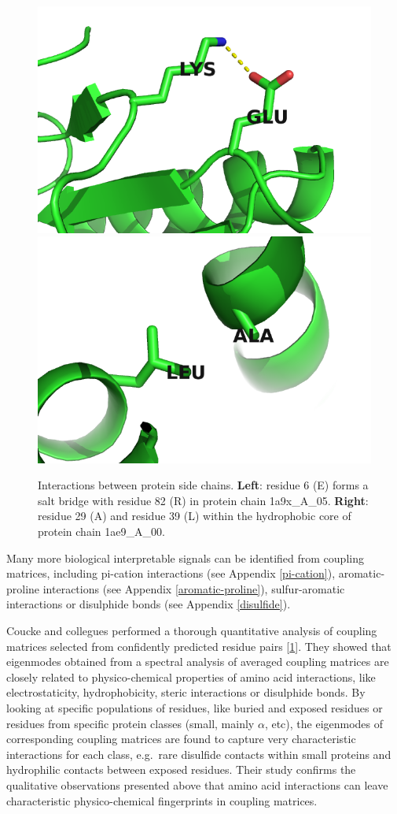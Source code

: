 \documentclass[12pt,a4paper,twoside]{book}
\theoremstyle{definition}
\theoremstyle{definition}
\theoremstyle{remark}
\begin{document}
\begin{figure}
\includegraphics[width=0.5\linewidth]{img/coupling_matrix_analysis/1a9xA05_6_82} \includegraphics[width=0.5\linewidth]{img/coupling_matrix_analysis/1ae9A00_29_39} \caption{Interactions between protein side
chains. \textbf{Left}: residue 6 (E) forms a salt bridge with residue 82
(R) in protein chain 1a9x\_A\_05. \textbf{Right}: residue 29 (A) and
residue 39 (L) within the hydrophobic core of protein chain 1ae9\_A\_00.}\label{fig:coupling-matrix-pymol}
\end{figure}

Many more biological interpretable signals can be identified from
coupling matrices, including pi-cation interactions (see Appendix
\ref{pi-cation}), aromatic-proline interactions (see Appendix
\ref{aromatic-proline}), sulfur-aromatic interactions or disulphide
bonds (see Appendix \ref{disulfide}).

Coucke and collegues performed a thorough quantitative analysis of
coupling matrices selected from confidently predicted residue pairs
{[}\protect\hyperlink{ref-Coucke2016}{1}{]}. They showed that eigenmodes
obtained from a spectral analysis of averaged coupling matrices are
closely related to physico-chemical properties of amino acid
interactions, like electrostaticity, hydrophobicity, steric interactions
or disulphide bonds. By looking at specific populations of residues,
like buried and exposed residues or residues from specific protein
classes (small, mainly \(\alpha\), etc), the eigenmodes of corresponding
coupling matrices are found to capture very characteristic interactions
for each class, e.g.~rare disulfide contacts within small proteins and
hydrophilic contacts between exposed residues. Their study confirms the
qualitative observations presented above that amino acid interactions
can leave characteristic physico-chemical fingerprints in coupling
matrices.
\end{document}
